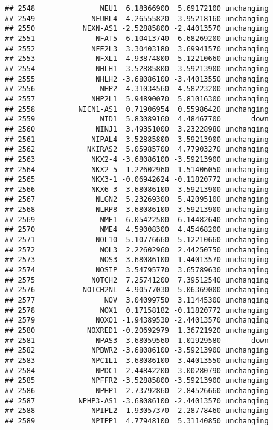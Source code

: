 \documentclass[]{article}
\begin{document}
\begin{verbatim}
## 2548               NEU1  6.18366900  5.69172100 unchanging
## 2549             NEURL4  4.26555820  3.95218160 unchanging
## 2550           NEXN-AS1 -2.52885800 -2.44013570 unchanging
## 2551              NFAT5  6.10413740  6.68269200 unchanging
## 2552             NFE2L3  3.30403180  3.69941570 unchanging
## 2553              NFXL1  4.93874800  5.12210660 unchanging
## 2554              NHLH1 -3.52885800 -3.59213900 unchanging
## 2555              NHLH2 -3.68086100 -3.44013550 unchanging
## 2556               NHP2  4.31034560  4.58223200 unchanging
## 2557             NHP2L1  5.94890070  5.81016300 unchanging
## 2558          NICN1-AS1  0.71906954  0.55986420 unchanging
## 2559               NID1  5.83089160  4.48467700       down
## 2560              NINJ1  3.49351000  3.23228980 unchanging
## 2561             NIPAL4 -3.52885800 -3.59213900 unchanging
## 2562            NKIRAS2  5.05985700  4.77903270 unchanging
## 2563             NKX2-4 -3.68086100 -3.59213900 unchanging
## 2564             NKX2-5  1.22602960  1.51406050 unchanging
## 2565             NKX3-1 -0.06942624 -0.11820772 unchanging
## 2566             NKX6-3 -3.68086100 -3.59213900 unchanging
## 2567              NLGN2  5.23269300  5.42095100 unchanging
## 2568              NLRP8 -3.68086100 -3.59213900 unchanging
## 2569               NME1  6.05422500  6.14482640 unchanging
## 2570               NME4  4.59008300  4.45468200 unchanging
## 2571              NOL10  5.10776660  5.12210660 unchanging
## 2572               NOL3  2.22602960  2.44250750 unchanging
## 2573               NOS3 -3.68086100 -1.44013570 unchanging
## 2574              NOSIP  3.54795770  3.65789630 unchanging
## 2575             NOTCH2  7.25741200  7.39512540 unchanging
## 2576           NOTCH2NL  4.90577030  5.06369000 unchanging
## 2577                NOV  3.04099750  3.11445300 unchanging
## 2578               NOX1  0.17158182 -0.11820772 unchanging
## 2579              NOXO1 -1.94389530 -2.44013570 unchanging
## 2580            NOXRED1 -0.20692979  1.36721920 unchanging
## 2581              NPAS3  3.68059560  1.01929580       down
## 2582             NPBWR2 -3.68086100 -3.59213900 unchanging
## 2583             NPC1L1 -3.68086100 -3.44013550 unchanging
## 2584              NPDC1  2.44842200  3.00280790 unchanging
## 2585             NPFFR2 -3.52885800 -3.59213900 unchanging
## 2586              NPHP1  2.73792860  2.84526660 unchanging
## 2587          NPHP3-AS1 -3.68086100 -2.44013570 unchanging
## 2588             NPIPL2  1.93057370  2.28778460 unchanging
## 2589             NPIPP1  4.77948100  5.31140850 unchanging

\end{verbatim}
\end{document}
